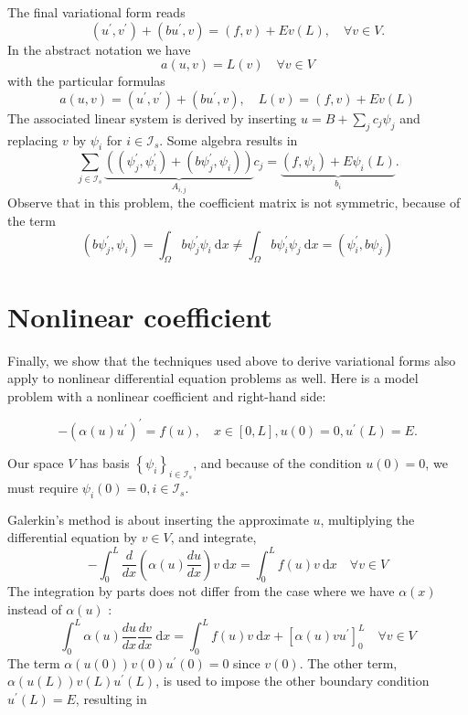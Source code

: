 \documentclass[../main.tex]{subfiles}
\begin{document}
		The final variational form reads
		$$ \left(u^{\prime}, v^{\prime}\right)+\left(b u^{\prime}, v\right)=(f, v)+E v(L), \quad \forall v \in V . $$
		In the abstract notation we have 
		$$ a(u, v)=L(v) \quad \forall v \in V $$ 
		with the particular formulas 
		$$ a(u, v)=\left(u^{\prime}, v^{\prime}\right)+\left(b u^{\prime}, v\right), \quad L(v)=(f, v)+E v(L) $$ \smallbreak
		The associated linear system is derived by inserting $u=B+\sum_{j} c_{j} \psi_{j}$ and replacing $v$ by $\psi_{i}$ for $i \in \mathcal{I}_{s}$. Some algebra results in
		$$	\sum_{j \in \mathcal{I}_{s}} \underbrace{\left(\left(\psi_{j}^{\prime}, \psi_{i}^{\prime}\right)+\left(b \psi_{j}^{\prime}, \psi_{i}\right)\right)}_{A_{i, j}} c_{j}=\underbrace{\left(f, \psi_{i}\right)+E \psi_{i}(L)}_{b_{i}} . $$
		Observe that in this problem, the coefficient matrix is not symmetric, because of the term
		$$ \left(b \psi_{j}^{\prime}, \psi_{i}\right)=\int_{\Omega} b \psi_{j}^{\prime} \psi_{i} \mathrm{~d} x \neq \int_{\Omega} b \psi_{i}^{\prime} \psi_{j} \mathrm{~d} x=\left(\psi_{i}^{\prime}, b \psi_{j}\right) $$
		
	\section[Nonlinear coefficient]{Nonlinear coefficient}
		\label{sec:sec_12_3}
		\noindent Finally, we show that the techniques used above to derive variational forms also apply to nonlinear differential equation problems as well. Here is a model problem with a nonlinear coefficient and right-hand side:

		\begin{equation}
		\label{eqa168}
			-\left(\alpha(u) u^{\prime}\right)^{\prime}=f(u), \quad x \in[0, L], u(0)=0, u^{\prime}(L)=E .
		\end{equation}
	
		\noindent Our space $V$ has basis $\left\{\psi_{i}\right\}_{i \in \mathcal{I}_{s}}$, and because of the condition $u(0)=0$, we must require $\psi_{i}(0)=0, i \in \mathcal{I}_{s}$.
		
		Galerkin's method is about inserting the approximate $u$, multiplying the differential equation by $v \in V$, and integrate,
		$$
		-\int_{0}^{L} \frac{d}{d x}\left(\alpha(u) \frac{d u}{d x}\right) v \mathrm{~d} x=\int_{0}^{L} f(u) v \mathrm{~d} x \quad \forall v \in V
		$$
		The integration by parts does not differ from the case where we have $\alpha(x)$ instead of $\alpha(u)$ :
		$$
		\int_{0}^{L} \alpha(u) \frac{d u}{d x} \frac{d v}{d x} \mathrm{~d} x=\int_{0}^{L} f(u) v \mathrm{~d} x+\left[\alpha(u) v u^{\prime}\right]_{0}^{L} \quad \forall v \in V
		$$
		The term $\alpha(u(0)) v(0) u^{\prime}(0)=0$ since $v(0)$. The other term, $\alpha(u(L)) v(L) u^{\prime}(L)$, is used to impose the other boundary condition $u^{\prime}(L)=E$, resulting in
		
\end{document}

